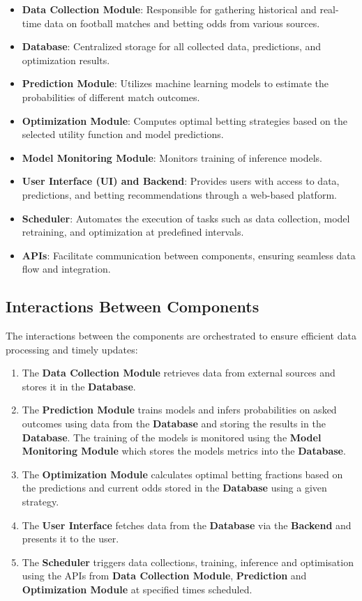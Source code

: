 \begin{itemize}
    \item \textbf{Data Collection Module}: Responsible for gathering historical and real-time data on football matches and betting odds from various sources.
    \item \textbf{Database}: Centralized storage for all collected data, predictions, and optimization results.
    \item \textbf{Prediction Module}: Utilizes machine learning models to estimate the probabilities of different match outcomes.
    \item \textbf{Optimization Module}: Computes optimal betting strategies based on the selected utility function and model predictions.
    \item \textbf{Model Monitoring Module}: Monitors training of inference models.
    \item \textbf{User Interface (UI) and Backend}: Provides users with access to data, predictions, and betting recommendations through a web-based platform.
    \item \textbf{Scheduler}: Automates the execution of tasks such as data collection, model retraining, and optimization at predefined intervals.
    \item \textbf{APIs}: Facilitate communication between components, ensuring seamless data flow and integration.
\end{itemize}

\subsection{Interactions Between Components}

The interactions between the components are orchestrated to ensure efficient data processing and timely updates:

\begin{enumerate}
    \item The \textbf{Data Collection Module} retrieves data from external sources and stores it in the \textbf{Database}.
    \item The \textbf{Prediction Module} trains models and infers probabilities on asked outcomes using data from the  \textbf{Database} and storing the results in the  \textbf{Database}. The training of the models is monitored using the \textbf{Model Monitoring Module} which stores the models metrics into the \textbf{Database}.
    \item The \textbf{Optimization Module} calculates optimal betting fractions based on the predictions and current odds stored in the \textbf{Database} using a given strategy.
    \item The \textbf{User Interface} fetches data from the \textbf{Database} via the \textbf{Backend} and presents it to the user.
    \item The \textbf{Scheduler} triggers data collections, training, inference and optimisation using the APIs from \textbf{Data Collection Module}, \textbf{Prediction} and \textbf{Optimization Module} at specified times scheduled.
\end{enumerate}

